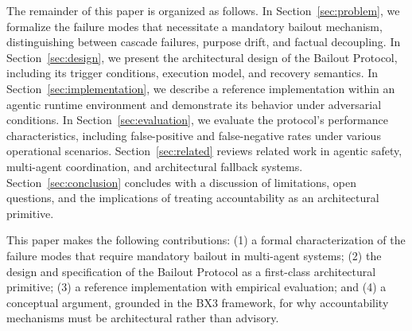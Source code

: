 The remainder of this paper is organized as follows. In Section~\ref{sec:problem}, we formalize the failure modes that necessitate a mandatory bailout mechanism, distinguishing between cascade failures, purpose drift, and factual decoupling. In Section~\ref{sec:design}, we present the architectural design of the Bailout Protocol, including its trigger conditions, execution model, and recovery semantics. In Section~\ref{sec:implementation}, we describe a reference implementation within an agentic runtime environment and demonstrate its behavior under adversarial conditions. In Section~\ref{sec:evaluation}, we evaluate the protocol's performance characteristics, including false-positive and false-negative rates under various operational scenarios. Section~\ref{sec:related} reviews related work in agentic safety, multi-agent coordination, and architectural fallback systems. Section~\ref{sec:conclusion} concludes with a discussion of limitations, open questions, and the implications of treating accountability as an architectural primitive.

This paper makes the following contributions: (1) a formal characterization of the failure modes that require mandatory bailout in multi-agent systems; (2) the design and specification of the Bailout Protocol as a first-class architectural primitive; (3) a reference implementation with empirical evaluation; and (4) a conceptual argument, grounded in the BX3 framework, for why accountability mechanisms must be architectural rather than advisory.
